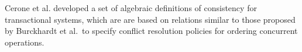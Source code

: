 \documentclass[journal,compsoc]{IEEEtran}
\begin{document}
Cerone et al. \cite{DBLP:conf/concur/CeroneGY17} developed a set of algebraic definitions of consistency for transactional systems, which are are based on relations similar to those proposed by Burckhardt et al.\ to specify conflict resolution policies for ordering concurrent operations.
\end{document}
